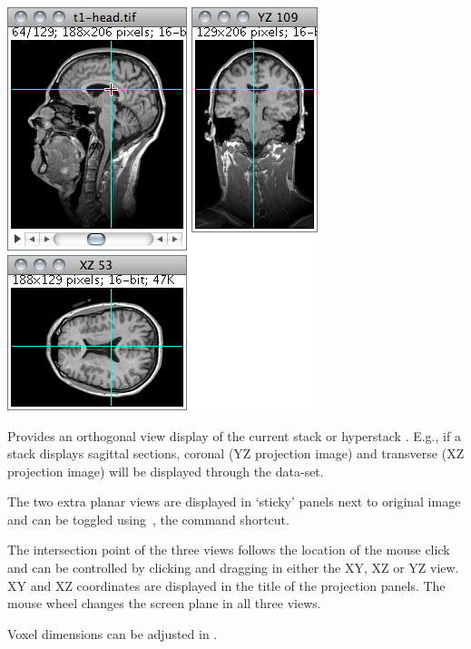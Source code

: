

\subsubsection{\protect{}\label{sub:Orthogonal-Views}}

\begin{minipage}[c][1\totalheight][t]{0.475\columnwidth}%
\includegraphics[scale=0.55]{images/OrthogonalViews}%
\end{minipage}%
\begin{minipage}[c][1\totalheight][t]{0.525\columnwidth}%
Provides an orthogonal view display of the
current stack or hyperstack \cite{C-OrthoViews}. E.g., if a stack
displays sagittal
sections, coronal
(YZ projection image) and transverse (XZ projection
image) will be displayed through the data-set.\medskip{}


The two extra planar
views are displayed in `sticky' panels next to original image and
can be toggled using  \,, the
command shortcut. \medskip{}


The intersection point of the three views follows the location of
the mouse click and can be controlled by clicking and dragging in
either the XY, XZ or YZ view. XY and XZ coordinates are displayed
in the title of the projection panels. The mouse wheel changes the
screen plane in all three views. \medskip{}


Voxel dimensions can be adjusted in .%
\end{minipage}


